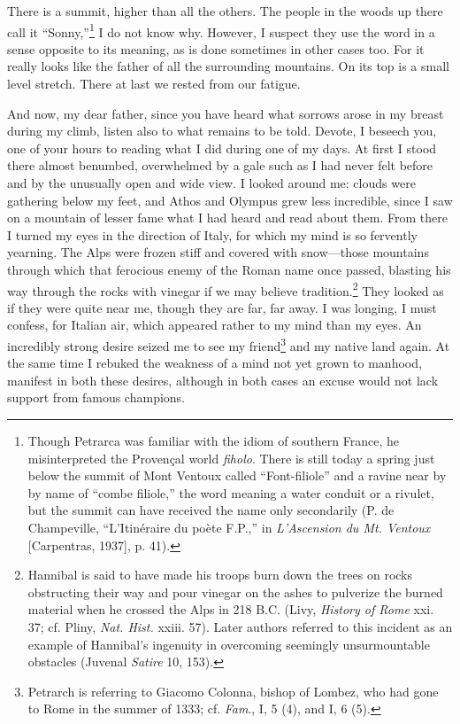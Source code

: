 There is a summit, higher than all the others. The people in the woods
up there call it ``Sonny,''\footnote{Though Petrarca was familiar with
the idiom of southern France, he misinterpreted the Proven\c{c}al
world \textit{fiholo}. There is still today a spring just below the
summit of Mont Ventoux called ``Font-filiole'' and a ravine near by by
name of ``combe filiole,'' the word meaning a water conduit or a
rivulet, but the summit can have received the name only secondarily
(P. de Champeville, ``L'Itin\'{e}raire du po\`{e}te F.P.,'' in
\textit{L'Ascension du Mt. Ventoux} [Carpentras, 1937], p. 41).} I do
not know why. However, I suspect they use the word in a sense opposite
to its meaning, as is done sometimes in other cases too. For it really
looks like the father of all the surrounding mountains. On its top is
a small level stretch. There at last we rested from our fatigue.

And now, my dear father, since you have heard what sorrows arose in my
breast during my climb, listen also to what remains to be told.
Devote, I beseech you, one of your hours to reading what I did during
one of my days. At first I stood there almost benumbed, overwhelmed by
a gale such as I had never felt before and by the unusually open and
wide view. I looked around me: clouds were gathering below my feet,
and Athos and Olympus grew less incredible, since I saw on a mountain
of lesser fame what I had heard and read about them. From there I
turned my eyes in the direction of Italy, for which my mind is so
fervently yearning. The Alps were frozen stiff and covered with
snow---those mountains through which that ferocious enemy of the Roman
name once passed, blasting his way through the rocks with vinegar if
we may believe tradition.\footnote{Hannibal is said to have made his
troops burn down the trees on rocks obstructing their way and pour
vinegar on the ashes to pulverize the burned material when he crossed
the Alps in 218 \textsc{B.C.} (Livy, \textit{History of Rome} xxi. 37;
cf. Pliny, \textit{Nat. Hist.} xxiii. 57). Later authors referred to
this incident as an example of Hannibal's ingenuity in overcoming
seemingly unsurmountable obstacles (Juvenal \textit{Satire} 10, 153).}
They looked as if they were quite near me, though they are far, far
away. I was longing, I must confess, for Italian air,  which
appeared rather to my mind than my eyes. An incredibly strong desire
seized me to see my friend\footnote{Petrarch is referring to Giacomo
Colonna, bishop of Lombez, who had gone to Rome in the summer of 1333;
cf. \textit{Fam}., I, 5 (4), and I, 6 (5).} and my native land again.
At the same time I rebuked the weakness of a mind not yet grown to
manhood, manifest in both these desires, although in both cases an
excuse would not lack support from famous champions.


